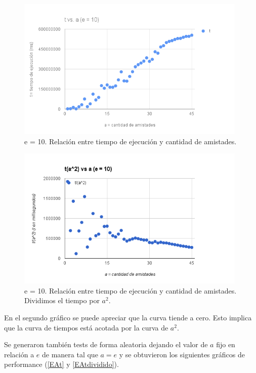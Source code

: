  \begin{figure}[h!]
   \begin{center}
 	\includegraphics[width=11cm]{imagenes/ej3/Efijo-t.png}
	\caption{e = 10. Relación entre tiempo de ejecución y cantidad de amistades.}
	\label{Efijot}
   \end{center}
 \end{figure}
 
 \begin{figure}[h!]
   \begin{center}
 	\includegraphics[width=11cm]{imagenes/ej3/Efijo-tdividido.png}
	\caption{e = 10. Relación entre tiempo de ejecución y cantidad de amistades. Dividimos el tiempo por $a^2$.}
	\label{Efijotdividido}
   \end{center}
 \end{figure}

En el segundo gráfico se puede apreciar que la curva tiende a cero. Esto implica que la curva de tiempos está acotada por la curva de $a^2$.


Se generaron también tests de forma aleatoria dejando el valor de $a$ fijo en relación a $e$ de manera tal que $a = e$ y se obtuvieron los siguientes gráficos de performance (\ref{EAt} y \ref{EAtdividido}).

